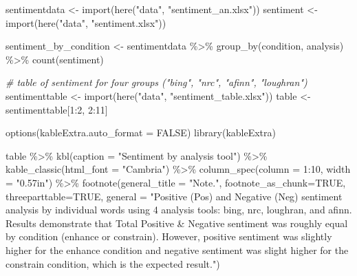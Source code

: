 \documentclass[
  english,
  man]{apa6}
\newenvironment{Shaded}{\begin{snugshade}}{\end{snugshade}}
\newcommand{\AttributeTok}[1]{\textcolor[rgb]{0.77,0.63,0.00}{#1}}
\newcommand{\CommentTok}[1]{\textcolor[rgb]{0.56,0.35,0.01}{\textit{#1}}}
\newcommand{\ConstantTok}[1]{\textcolor[rgb]{0.00,0.00,0.00}{#1}}
\newcommand{\DecValTok}[1]{\textcolor[rgb]{0.00,0.00,0.81}{#1}}
\newcommand{\FunctionTok}[1]{\textcolor[rgb]{0.00,0.00,0.00}{#1}}
\newcommand{\NormalTok}[1]{#1}
\newcommand{\OtherTok}[1]{\textcolor[rgb]{0.56,0.35,0.01}{#1}}
\newcommand{\SpecialCharTok}[1]{\textcolor[rgb]{0.00,0.00,0.00}{#1}}
\newcommand{\StringTok}[1]{\textcolor[rgb]{0.31,0.60,0.02}{#1}}
\begin{document}
\begin{Shaded}
\begin{Highlighting}[]
\NormalTok{sentimentdata }\OtherTok{\textless{}{-}} \FunctionTok{import}\NormalTok{(}\FunctionTok{here}\NormalTok{(}\StringTok{"data"}\NormalTok{, }\StringTok{"sentiment\_an.xlsx"}\NormalTok{))}
\NormalTok{sentiment }\OtherTok{\textless{}{-}} \FunctionTok{import}\NormalTok{(}\FunctionTok{here}\NormalTok{(}\StringTok{"data"}\NormalTok{, }\StringTok{"sentiment.xlsx"}\NormalTok{))}

\NormalTok{sentiment\_by\_condition }\OtherTok{\textless{}{-}}\NormalTok{ sentimentdata }\SpecialCharTok{\%\textgreater{}\%}
  \FunctionTok{group\_by}\NormalTok{(condition, analysis) }\SpecialCharTok{\%\textgreater{}\%}
  \FunctionTok{count}\NormalTok{(sentiment)}

\CommentTok{\# table of sentiment for four groups ("bing", "nrc", "afinn", "loughran")}
\NormalTok{sentimenttable }\OtherTok{\textless{}{-}} \FunctionTok{import}\NormalTok{(}\FunctionTok{here}\NormalTok{(}\StringTok{"data"}\NormalTok{, }\StringTok{"sentiment\_table.xlsx"}\NormalTok{))}
\NormalTok{table }\OtherTok{\textless{}{-}}\NormalTok{ sentimenttable[}\DecValTok{1}\SpecialCharTok{:}\DecValTok{2}\NormalTok{, }\DecValTok{2}\SpecialCharTok{:}\DecValTok{11}\NormalTok{]}

\FunctionTok{options}\NormalTok{(}\AttributeTok{kableExtra.auto\_format =} \ConstantTok{FALSE}\NormalTok{)}
\FunctionTok{library}\NormalTok{(kableExtra)}


\NormalTok{table }\SpecialCharTok{\%\textgreater{}\%} 
  \FunctionTok{kbl}\NormalTok{(}\AttributeTok{caption =} \StringTok{"Sentiment by analysis tool"}\NormalTok{) }\SpecialCharTok{\%\textgreater{}\%}
  \FunctionTok{kable\_classic}\NormalTok{(}\AttributeTok{html\_font =} \StringTok{"Cambria"}\NormalTok{) }\SpecialCharTok{\%\textgreater{}\%}
  \FunctionTok{column\_spec}\NormalTok{(}\AttributeTok{column =} \DecValTok{1}\SpecialCharTok{:}\DecValTok{10}\NormalTok{, }\AttributeTok{width =} \StringTok{"0.57in"}\NormalTok{) }\SpecialCharTok{\%\textgreater{}\%}
  \FunctionTok{footnote}\NormalTok{(}\AttributeTok{general\_title =} \StringTok{"Note."}\NormalTok{, }\AttributeTok{footnote\_as\_chunk=}\ConstantTok{TRUE}\NormalTok{, }\AttributeTok{threeparttable=}\ConstantTok{TRUE}\NormalTok{, }\AttributeTok{general =} \StringTok{"Positive (Pos) and Negative (Neg) sentiment analysis by individual words using 4 analysis tools: bing, nrc, loughran, and afinn. Results demonstrate that Total Positive \& Negative sentiment was roughly equal by condition (enhance or constrain). However, positive sentiment was slightly higher for the enhance condition and negative sentiment was slight higher for the constrain condition, which is the expected result."}\NormalTok{) }
\end{Highlighting}
\end{Shaded}
\end{document}
